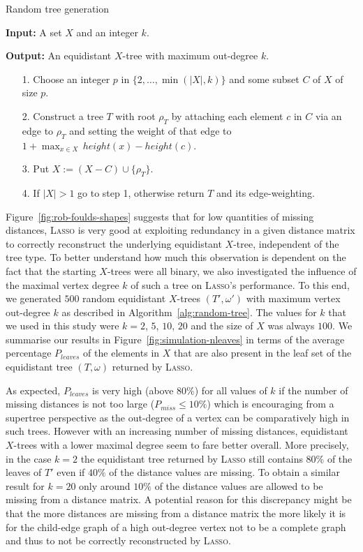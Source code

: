\begin{algorithm}[h!]
  \caption{Random tree generation}
  \label{alg:random-tree}
  \textbf{Input:} A set $X$ and an integer $k$.
  
  \textbf{Output:} An equidistant $X$-tree with maximum
  out-degree $k$.

  \begin{itemize}
  \item[1.] Choose an integer 
$p$ in $\{2, \dotsc, \min(|X|,k)\}$ and some subset $C$ of $X$ of size $p$.
  \item[2.] Construct a tree $T$ with root $\rho_T$ by
attaching each element $c$ in $C$ via an edge to $\rho_T$ 
and setting the weight of that edge to $ 1+ \max_{x \in X} \, height(x)
- height(c)$.
  \item[3.] Put $X := (X - C) \cup \{\rho_T\}$.
  \item[4.] If $|X| > 1$ go to step 1, otherwise return $T$ 
    and its edge-weighting.
  \end{itemize}
\end{algorithm}

Figure~\ref{fig:rob-foulds-shapes} suggests that for low quantities of missing
distances, \textsc{Lasso} is very good at exploiting redundancy in a given
distance matrix to correctly reconstruct the underlying equidistant $X$-tree,
independent of the tree type. To better understand how much this observation
is dependent on the fact that the starting $X$-trees were all binary, we also
investigated the influence of the maximal vertex degree $k$ of such a tree on
\textsc{Lasso}'s performance. To this end, we generated $500$ random
equidistant $X$-trees $(T',\omega')$ with maximum vertex out-degree $k$ as
described in Algorithm~\ref{alg:random-tree}.  The values for $k$ that we used
in this study were $k=2$, $5$, $10$, $20$ and the size of $X$ was always
$100$. We summarise our results in Figure~\ref{fig:simulation-nleaves} in
terms of the average percentage $P_{leaves}$ of the elements in $X$ that are
also present in the leaf set of the equidistant tree $(T,\omega)$ returned by
\textsc{Lasso}.

As expected, $P_{leaves}$ is very high (above $80\%$) for all values of $k$ if
the number of missing distances is not too large ($P_{miss}\leq 10\%$) which
is encouraging from a supertree perspective as the out-degree of a vertex can
be comparatively high in such trees.  However with an increasing number of
missing distances, equidistant $X$-trees with a lower maximal degree seem to
fare better overall. More precisely, in the case $k=2$ the equidistant tree
returned by \textsc{Lasso} still contains $80\%$ of the leaves of $T'$ even if
$40\%$ of the distance values are missing. To obtain a similar result for
$k=20$ only around $10\%$ of the distance values are allowed to be missing
from a distance matrix.  A potential reason for this discrepancy might be that
the more distances are missing from a distance matrix the more likely it is
for the child-edge graph of a high out-degree vertex not to be a complete
graph and thus to not be correctly reconstructed by \textsc{Lasso}.

